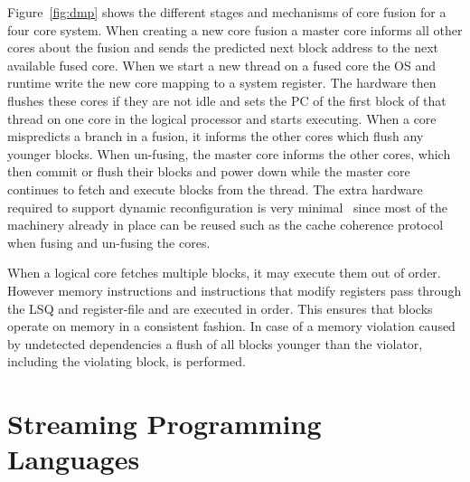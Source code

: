 Figure~\ref{fig:dmp} shows the different stages and mechanisms of core fusion for a four core system.
When creating a new core fusion a master core informs all other cores about the fusion and sends the predicted next block address to the next available fused core.
When we start a new thread on a fused core the OS and runtime write the new core mapping to a system register.
The hardware then flushes these cores if they are not idle and sets the PC of the first block of that thread on one core in the logical processor and starts executing.
When a core mispredicts a branch in a fusion, it informs the other cores which flush any younger blocks.
When un-fusing, the master core informs the other cores, which then commit or flush their blocks and power down while the master core continues to fetch and execute blocks from the thread.
The extra hardware required to support dynamic reconfiguration is very minimal~\cite{kim2007tflex} since most of the machinery already in place can be reused such as the cache coherence protocol when fusing and un-fusing the cores.

When a logical core fetches multiple blocks, it may execute them out of order.
However memory instructions and instructions that modify registers pass through the LSQ and register-file and are executed in order.
This ensures that blocks operate on memory in a consistent fashion.
In case of a memory violation caused by undetected dependencies a flush of all blocks younger than the violator, including the violating block, is performed.


\section{Streaming Programming Languages}


